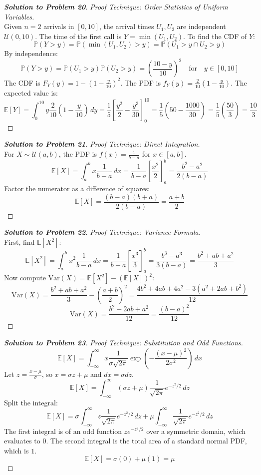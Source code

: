 \documentclass[11pt, a4paper]{article}
\theoremstyle{definition}
\theoremstyle{remark}
\newcommand{\E}{\mathbb{E}}
\newcommand{\Prob}{\mathbb{P}}
\begin{document}
\begin{proof}[\textbf{Solution to Problem 20}]
\textit{Proof Technique: Order Statistics of Uniform Variables.} \\
Given $n=2$ arrivals in $[0, 10]$, the arrival times $U_1, U_2$ are independent $\mathcal{U}(0, 10)$. The time of the first call is $Y = \min(U_1, U_2)$.
To find the CDF of $Y$:
\[ \Prob(Y > y) = \Prob(\min(U_1, U_2) > y) = \Prob(U_1 > y \cap U_2 > y) \]
By independence:
\[ \Prob(Y > y) = \Prob(U_1 > y)\Prob(U_2 > y) = \left(\frac{10-y}{10}\right)^2 \quad \text{for} \quad y \in [0, 10] \]
The CDF is $F_Y(y) = 1 - \left(1 - \frac{y}{10}\right)^2$. The PDF is $f_Y(y) = \frac{2}{10}\left(1 - \frac{y}{10}\right)$.
The expected value is:
\[ \E[Y] = \int_{0}^{10} y \frac{2}{10}\left(1 - \frac{y}{10}\right) \, dy = \frac{1}{5} \left[ \frac{y^2}{2} - \frac{y^3}{30} \right]_0^{10} = \frac{1}{5} \left( 50 - \frac{1000}{30} \right) = \frac{1}{5} \left( \frac{50}{3} \right) = \frac{10}{3} \]
\end{proof}

\begin{proof}[\textbf{Solution to Problem 21}]
\textit{Proof Technique: Direct Integration.} \\
For $X \sim \mathcal{U}(a, b)$, the PDF is $f(x) = \frac{1}{b-a}$ for $x \in [a, b]$.
\[ \E[X] = \int_{a}^{b} x \frac{1}{b-a} \, dx = \frac{1}{b-a} \left[ \frac{x^2}{2} \right]_a^b = \frac{b^2 - a^2}{2(b-a)} \]
Factor the numerator as a difference of squares:
\[ \E[X] = \frac{(b-a)(b+a)}{2(b-a)} = \frac{a+b}{2} \]
\end{proof}

\begin{proof}[\textbf{Solution to Problem 22}]
\textit{Proof Technique: Variance Formula.} \\
First, find $\E[X^2]$:
\[ \E[X^2] = \int_{a}^{b} x^2 \frac{1}{b-a} \, dx = \frac{1}{b-a} \left[ \frac{x^3}{3} \right]_a^b = \frac{b^3 - a^3}{3(b-a)} = \frac{b^2 + ab + a^2}{3} \]
Now compute $\text{Var}(X) = \E[X^2] - (\E[X])^2$:
\[ \text{Var}(X) = \frac{b^2 + ab + a^2}{3} - \left(\frac{a+b}{2}\right)^2 = \frac{4b^2 + 4ab + 4a^2 - 3(a^2 + 2ab + b^2)}{12} \]
\[ \text{Var}(X) = \frac{b^2 - 2ab + a^2}{12} = \frac{(b-a)^2}{12} \]
\end{proof}

\begin{proof}[\textbf{Solution to Problem 23}]
\textit{Proof Technique: Substitution and Odd Functions.} \\
\[ \E[X] = \int_{-\infty}^{\infty} x \frac{1}{\sigma\sqrt{2\pi}} \exp\left(-\frac{(x-\mu)^2}{2\sigma^2}\right) \, dx \]
Let $z = \frac{x-\mu}{\sigma}$, so $x = \sigma z + \mu$ and $dx = \sigma dz$.
\[ \E[X] = \int_{-\infty}^{\infty} (\sigma z + \mu) \frac{1}{\sqrt{2\pi}} e^{-z^2/2} \, dz \]
Split the integral:
\[ \E[X] = \sigma \int_{-\infty}^{\infty} z \frac{1}{\sqrt{2\pi}} e^{-z^2/2} \, dz + \mu \int_{-\infty}^{\infty} \frac{1}{\sqrt{2\pi}} e^{-z^2/2} \, dz \]
The first integral is of an odd function $z e^{-z^2/2}$ over a symmetric domain, which evaluates to $0$. The second integral is the total area of a standard normal PDF, which is $1$.
\[ \E[X] = \sigma(0) + \mu(1) = \mu \]
\end{proof}
\end{document}
